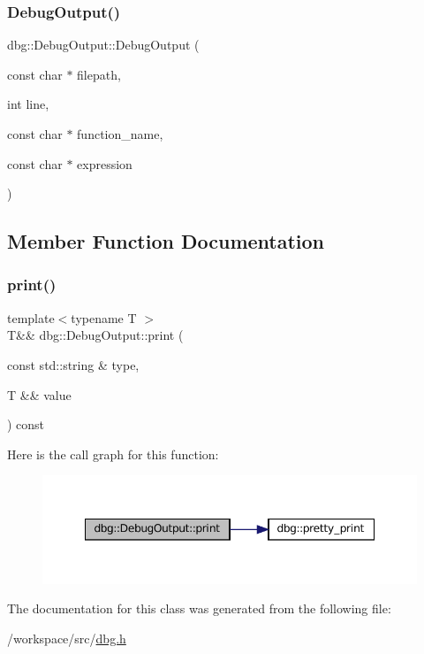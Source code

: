 \subsubsection{\texorpdfstring{Debug\+Output()}{DebugOutput()}}
{\footnotesize\ttfamily dbg\+::\+Debug\+Output\+::\+Debug\+Output (\begin{DoxyParamCaption}\item[{const char $\ast$}]{filepath,  }\item[{int}]{line,  }\item[{const char $\ast$}]{function\+\_\+name,  }\item[{const char $\ast$}]{expression }\end{DoxyParamCaption})\hspace{0.3cm}{\ttfamily [inline]}}



\subsection{Member Function Documentation}
\mbox{\label{classdbg_1_1_debug_output_a1cb30d4b0445e697de3a653c5cb10b7c}} 
\subsubsection{\texorpdfstring{print()}{print()}}
{\footnotesize\ttfamily template$<$typename T $>$ \\
T\&\& dbg\+::\+Debug\+Output\+::print (\begin{DoxyParamCaption}\item[{const std\+::string \&}]{type,  }\item[{T \&\&}]{value }\end{DoxyParamCaption}) const\hspace{0.3cm}{\ttfamily [inline]}}

Here is the call graph for this function\+:
\nopagebreak
\begin{figure}[H]
\begin{center}
\leavevmode
\includegraphics[width=348pt]{classdbg_1_1_debug_output_a1cb30d4b0445e697de3a653c5cb10b7c_cgraph}
\end{center}
\end{figure}


The documentation for this class was generated from the following file\+:\begin{DoxyCompactItemize}
\item 
/workspace/src/\hyperlink{dbg_8h}{dbg.\+h}\end{DoxyCompactItemize}
